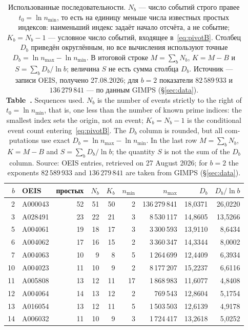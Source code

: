 \documentclass[11pt,a4paper]{article}
\newcommand{\encaptab}[1]{\\[3pt]\foreignlanguage{english}{%
  \textbf{Table~\thetable.} #1}}
\theoremstyle{plain}
\theoremstyle{remark}
\begin{document}
\begin{table}[t]
\centering
\caption{Использованные последовательности. $N_b$ --- число событий строго правее
$t_0=\ln n_{\min}$, то есть на единицу меньше числа известных простых индексов:
наименьший индекс задаёт начало отсчёта, а не событие; $K_b=N_b-1$ --- условное
число событий, входящее в~\eqref{eq:pivotB}. Столбец $D_b$ приведён округлённым,
но все вычисления используют точные $D_b=\ln n_{\max}-\ln n_{\min}$. В итоговой
строке $M=\sum_b N_b$, $K=M-B$ и $S=\sum_b D_b/\ln b$; величина $S$ не есть сумма
столбца $D_b$. Источник --- записи OEIS, получено 27.08.2026; для $b=2$
показатели $82\,589\,933$ и $136\,279\,841$ --- по данным GIMPS (\S\ref{sec:data}).
\encaptab{Sequences used. $N_b$ is the number of events strictly to the right of
$t_0=\ln n_{\min}$, that is, one less than the number of known prime indices: the
smallest index sets the origin, not an event; $K_b=N_b-1$ is the conditional event
count entering~\eqref{eq:pivotB}. The $D_b$ column is rounded, but all computations
use exact $D_b=\ln n_{\max}-\ln n_{\min}$. In the last row $M=\sum_b N_b$, $K=M-B$
and $S=\sum_b D_b/\ln b$; the quantity $S$ is not the sum of the $D_b$ column.
Source: OEIS entries, retrieved on 27 August 2026; for $b=2$ the exponents
$82\,589\,933$ and $136\,279\,841$ are taken from GIMPS (\S\ref{sec:data}).}}
\label{tab:data}
\small
\begin{tabular}{rlrrrrrrr}
\toprule
$b$ & OEIS & простых & $N_b$ & $K_b$ & $n_{\min}$ & $n_{\max}$ & $D_b$ & $D_b/\ln b$\\
\midrule
2 & A000043 & 52 & 51 & 50 & 2 & 136\,279\,841 & 18{,}0371 & 26{,}0220\\
3 & A028491 & 23 & 22 & 21 & 3 & 8\,530\,117 & 14{,}8605 & 13{,}5266\\
5 & A004061 & 19 & 18 & 17 & 3 & 3\,300\,593 & 13{,}9110 & 8{,}6434\\
6 & A004062 & 17 & 16 & 15 & 2 & 3\,360\,347 & 14{,}3344 & 8{,}0002\\
7 & A004063 & 10 & 9 & 8 & 5 & 1\,264\,699 & 12{,}4409 & 6{,}3934\\
10 & A004023 & 11 & 10 & 9 & 2 & 8\,177\,207 & 15{,}2237 & 6{,}6116\\
11 & A005808 & 13 & 12 & 11 & 17 & 1\,868\,983 & 11{,}6077 & 4{,}8408\\
12 & A004064 & 14 & 13 & 12 & 2 & 769\,543 & 12{,}8604 & 5{,}1754\\
13 & A016054 & 13 & 12 & 11 & 5 & 1\,503\,503 & 12{,}6139 & 4{,}9178\\
14 & A006032 & 11 & 10 & 9 & 3 & 1\,724\,417 & 13{,}2618 & 5{,}0252\\

\end{tabular}
\end{table}
\end{document}
